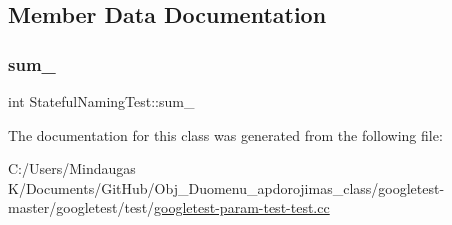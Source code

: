 \subsection{Member Data Documentation}
\mbox{\label{class_stateful_naming_test_ad719a1c2919c304bfe840313142a376a}} 
\subsubsection{\texorpdfstring{sum\_}{sum\_}}
{\footnotesize\ttfamily int Stateful\+Naming\+Test\+::sum\+\_\+\hspace{0.3cm}{\ttfamily [protected]}}



The documentation for this class was generated from the following file\+:\begin{DoxyCompactItemize}
\item 
C\+:/\+Users/\+Mindaugas K/\+Documents/\+Git\+Hub/\+Obj\+\_\+\+Duomenu\+\_\+apdorojimas\+\_\+class/googletest-\/master/googletest/test/\mbox{\hyperlink{googletest-master_2googletest_2test_2googletest-param-test-test_8cc}{googletest-\/param-\/test-\/test.\+cc}}\end{DoxyCompactItemize}
